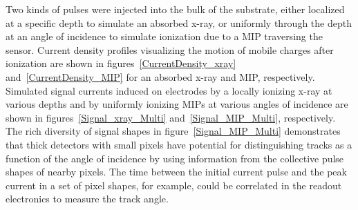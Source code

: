 Two kinds of pulses were injected into the bulk of the substrate, either localized at a specific depth to simulate an absorbed x-ray, or uniformly through the depth at an angle of incidence to simulate ionization due to a MIP traversing the sensor.
Current density profiles visualizing the motion of mobile charges after ionization are shown in figures~\ref{CurrentDensity_xray} and~\ref{CurrentDensity_MIP} for an absorbed x-ray and MIP, respectively.
Simulated signal currents induced on electrodes by a locally ionizing x-ray at various depths and by uniformly ionizing MIPs at various angles of incidence are shown in figures~\ref{Signal_xray_Multi} and~\ref{Signal_MIP_Multi}, respectively.
The rich diversity of signal shapes in figure~\ref{Signal_MIP_Multi} demonstrates that thick detectors with small pixels have potential for distinguishing tracks as a function of the angle of incidence by using information from the collective pulse shapes of nearby pixels. 
The time between the initial current pulse and the peak current in a set of pixel shapes, for example, could be correlated in the readout electronics to measure the track angle.

